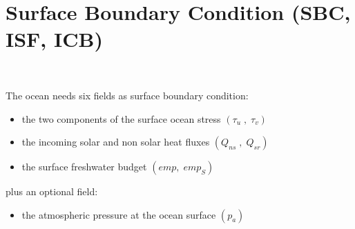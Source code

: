 \chapter{Surface Boundary Condition (SBC, ISF, ICB) }
\label{SBC}
\minitoc

\newpage
$\ $\newline    %
$\ $\newline    %

The ocean needs six fields as surface boundary condition:
\begin{itemize}
	\item the two components of the surface ocean stress $\left( {\tau _u \;,\;\tau _v} \right)$
	\item the incoming solar and non solar heat fluxes $\left( {Q_{ns} \;,\;Q_{sr} } \right)$
	\item the surface freshwater budget $\left( {\textit{emp},\;\textit{emp}_S } \right)$
\end{itemize}
plus an optional field:
\begin{itemize}
	\item the atmospheric pressure at the ocean surface $\left( p_a \right)$
\end{itemize}

